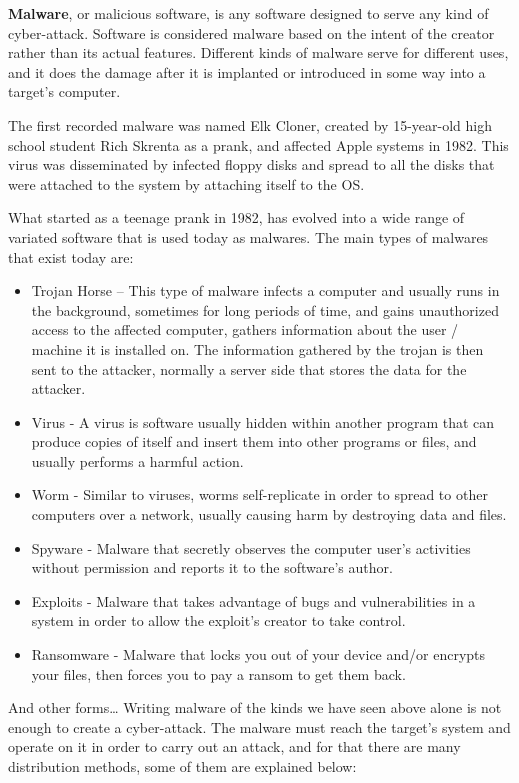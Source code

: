 \documentclass{article}
\begin{document}
\indent \textbf{Malware}, or malicious software, is any software designed to serve any kind of cyber-attack. Software is considered malware based on the intent of the creator rather than its actual features. Different kinds of malware serve for different uses, and it does the damage after it is implanted or introduced in some way into a target's computer. 

\indent The first recorded malware was named Elk Cloner, created by 15-year-old high school student Rich Skrenta as a prank, and affected Apple  systems in 1982. This virus was disseminated by infected floppy disks and spread to all the disks that were attached to the system by attaching itself to the OS.

\indent What started as a teenage prank in 1982, has evolved into a wide range of variated software that is used today as malwares. The main types of malwares that exist today are: 

\begin{itemize}
  \item Trojan Horse – This type of malware infects a computer and usually runs in the background, sometimes for long periods of time, and gains unauthorized access to the affected computer, gathers information about the user / machine it is installed on. The information gathered by the trojan is then sent to the attacker, normally a server side that stores the data for the attacker.
  \item Virus - A virus is software usually hidden within another program that can produce copies of itself and insert them into other programs or files, and usually performs a harmful action.
  \item Worm -  Similar to viruses, worms self-replicate in order to spread to other computers over a network, usually causing harm by destroying data and files.
  \item Spyware - Malware that secretly observes the computer user's activities without permission and reports it to the software's author.
  \item Exploits - Malware that takes advantage of bugs and vulnerabilities in a system in order to allow the exploit’s creator to take control.
  \item Ransomware - Malware that locks you out of your device and/or encrypts your files, then forces you to pay a ransom to get them back.
\end{itemize}

\indent And other forms…
\newline
\newline
\indent Writing malware of the kinds we have seen above alone is not enough to create a cyber-attack. The malware must reach the target's system and operate on it in order to carry out an attack, and for that there are many distribution methods, some of them are explained below:
\end{document}
